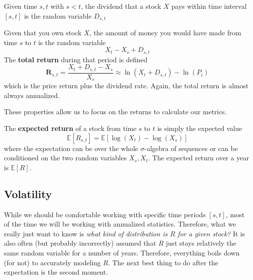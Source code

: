 \documentclass{article}
\begin{document}
    \begin{definition}[Dividend]
      Given time $s, t$ with $s < t$, the dividend that a stock $X$ pays within time interval $[s, t]$ is the random variable $D_{s, t}$
    \end{definition}

    \begin{definition}
      Given that you own stock $X$, the amount of money you would have made from time $s$ to $t$ is the random variable 
      \begin{equation}
        X_t - X_s + D_{s, t}
      \end{equation}
      The \textbf{total return} during that period is defined 
      \begin{equation}
        \mathbf{R}_{s, t} = \frac{X_t + D_{s, t} - X_s}{X_s} \approx \ln(X_t + D_{s, t}) - \ln (P_i)
      \end{equation}
      which is the price return plus the dividend rate. Again, the total return is almost always annualized.   
    \end{definition}

    These properties allow us to focus on the returns to calculate our metrics. 

    \begin{definition}
      The \textbf{expected return} of a stock from time $s$ to $t$ is simply the expected value 
      \begin{equation}
        \mathbb{E}[R_{s, t}] = \mathbb{E} [ \log(X_t) - \log(X_s) ]
      \end{equation}
      where the expectation can be over the whole $\sigma$-algebra of sequences or can be conditioned on the two random variables $X_s, X_t$. The expected return over a year is $\mathbb{E}[R]$. 
    \end{definition}

  \subsection{Volatility}

    While we should be comfortable working with specific time periods $[s, t]$, most of the time we will be working with annualized statistics. Therefore, what we really just want to know is \textit{what kind of distribution is $R$ for a given stock?} It is also often (but probably incorrectly) assumed that $R$ just stays relatively the same random variable for a number of years. Therefore, everything boils down (for not) to accurately modeling $R$. The next best thing to do after the expectation is the second moment. 
\end{document}

